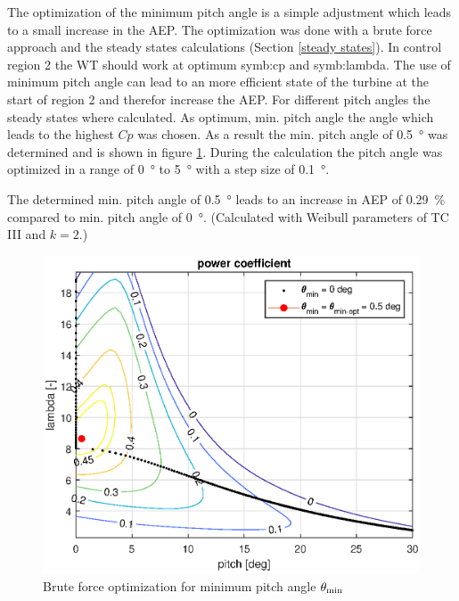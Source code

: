 The optimization of the minimum pitch angle is a simple adjustment which leads to a small increase in the AEP. 
The optimization was done with a brute force approach and the steady states calculations (Section \ref{steady states}). 
In control region 2 the WT should work at optimum \gls{symb:cp} and \gls{symb:lambda}. 
The use of minimum pitch angle can lead to an more efficient state of the turbine at the start of region 2 and therefor increase the AEP. 
For different pitch angles the steady states where calculated. 
As optimum, min. pitch angle the angle which leads to the highest $Cp$ was chosen. 
As a result the min. pitch angle of \SI{0.5}{\degree} was determined and is shown in figure \ref{fig:theta min general}. 
During the calculation the pitch angle was optimized in a range of \SI{0}{\degree} to \SI{5}{\degree} with a step size of \SI{0.1}{\degree}.

The determined min. pitch angle of \SI{0.5}{\degree} leads to an increase in AEP of \SI{0.29}{\%} compared to min. pitch angle of \SI{0}{\degree}. 
(Calculated with Weibull parameters of TC III and $k=2$.)

\begin{figure}[tbh]
	\centering	
	\includegraphics[width=12cm]{Figures/ThetaMinOpt}
	\caption{Brute force optimization for minimum pitch angle $\theta_\textnormal{min}$}
	\label{fig:theta min general}
\end{figure}